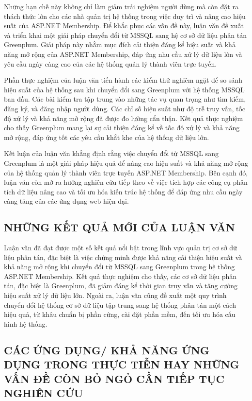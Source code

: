 \documentclass{article}[14pt]
\begin{document}
Những hạn chế này không chỉ làm giảm trải nghiệm người dùng mà còn đặt ra thách thức lớn cho các nhà quản trị hệ thống trong việc duy trì và nâng cao hiệu suất của ASP.NET Membership. Để khắc phục các vấn đề này, luận văn đề xuất và triển khai một giải pháp chuyển đổi từ MSSQL sang hệ cơ sở dữ liệu phân tán Greenplum. Giải pháp này nhằm mục đích cải thiện đáng kể hiệu suất và khả năng mở rộng của ASP.NET Membership, đáp ứng nhu cầu xử lý dữ liệu lớn và yêu cầu ngày càng cao của các hệ thống quản lý thành viên trực tuyến.


Phần thực nghiệm của luận văn tiến hành các kiểm thử nghiêm ngặt để so sánh hiệu suất của hệ thống sau khi chuyển đổi sang Greenplum với hệ thống MSSQL ban đầu. Các bài kiểm tra tập trung vào những tác vụ quan trọng như tìm kiếm, đăng ký, và đăng nhập người dùng. Các chỉ số hiệu suất như độ trễ truy vấn, tốc độ xử lý và khả năng mở rộng đã được đo lường cẩn thận. Kết quả thực nghiệm cho thấy Greenplum mang lại sự cải thiện đáng kể về tốc độ xử lý và khả năng mở rộng, đáp ứng tốt các yêu cầu khắt khe của hệ thống dữ liệu lớn.

Kết luận của luận văn khẳng định rằng việc chuyển đổi từ MSSQL sang Greenplum là một giải pháp hiệu quả để nâng cao hiệu suất và khả năng mở rộng của hệ thống quản lý thành viên trực tuyến ASP.NET Membership. Bên cạnh đó, luận văn còn mở ra hướng nghiên cứu tiếp theo về việc tích hợp các công cụ phân tích dữ liệu nâng cao và tối ưu hóa kiến trúc hệ thống để đáp ứng nhu cầu ngày càng tăng của các ứng dụng web hiện đại.


\subsection{NHỮNG KẾT QUẢ MỚI CỦA LUẬN VĂN}
Luận văn đã đạt được một số kết quả nổi bật trong lĩnh vực quản trị cơ sở dữ liệu phân tán, đặc biệt là việc chứng minh được khả năng cải thiện hiệu suất và khả năng mở rộng khi chuyển đổi từ MSSQL sang Greenplum trong hệ thống ASP.NET Membership. Kết quả thực nghiệm cho thấy, các cơ sở dữ liệu phân tán, đặc biệt là Greenplum, đã giảm đáng kể thời gian truy vấn và tăng cường hiệu suất xử lý dữ liệu lớn. Ngoài ra, luận văn cũng đề xuất một quy trình chuyển đổi hệ thống cơ sở dữ liệu tập trung sang hệ thống phân tán một cách hiệu quả, từ khâu chuẩn bị phần cứng, cài đặt phần mềm, đến tối ưu hóa cấu hình hệ thống.


\subsection{ CÁC ỨNG DỤNG/ KHẢ NĂNG ỨNG DỤNG TRONG THỰC TIỄN
HAY NHỮNG VẤN ĐỀ CÒN BỎ NGỎ CẦN TIẾP TỤC NGHIÊN CỨU}
\end{document}
